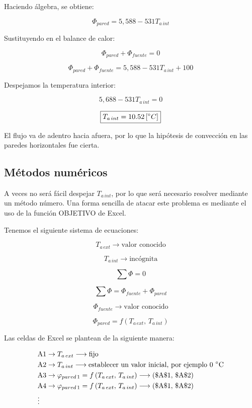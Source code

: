 \documentclass[12pt]{article}
\begin{document}
Haciendo álgebra, se obtiene:

\[ \Phi _{ pared } = 5,588 - 531 T_{ a \, int } \]

Sustituyendo en el balance de calor:

\[ \Phi _{ pared } + \Phi _{ fuente } = 0 \]

\[ \Phi _{ pared } + \Phi _{ fuente } = 5,588 -531 T_{ a \, int } + 100 \]

Despejamos la temperatura interior: 

\[ 5,688 - 531 T_{ a \, int } = 0 \]

\[ \boxed{
    T_{ a \, int } = 10.52 \left[ \degree C \right]
} \]

El flujo va de adentro hacia afuera, por lo que la hipótesis de convección en las paredes horizontales fue cierta.

\subsection*{Métodos numéricos}

A veces no será fácil despejar $ T_{ a \, int} $, por lo que será necesario resolver mediante un método número. Una forma sencilla de atacar este problema es mediante el uso de la función OBJETIVO de Excel.

Tenemos el siguiente sistema de ecuaciones:

\[ T_{ a \, ext } \longrightarrow \text{valor conocido} \]

\[ T_{ a \, int } \longrightarrow \text{incógnita} \]

\[ \sum{ \Phi } = 0 \]

\[ \sum{ \Phi } = \Phi _{ fuente } + \Phi _{ pared } \]

\[ \Phi _{ fuente } \longrightarrow \text{valor conocido} \]

\[ \Phi _{ pared } = f \left( T_{ a \, ext }, \, T_{ a \, int } \right) \]

Las celdas de Excel se plantean de la siguiente manera:


\[ \begin{aligned}
    & \mathrm{A} 1 \rightarrow T_{ a \, ext } \longrightarrow \text{fijo} \\
    & \mathrm{A} 2 \rightarrow T_{ a \, int } \longrightarrow \text{establecer un valor inicial, por ejemplo 0 \degree C} \\
    & \mathrm{A} 3 \rightarrow \varphi _{ pared \, 1 } = f \left( T_{ a \, ext }, \, T_{ a \, int } \right) \longrightarrow  \left( \$ \mathrm{A} \$ 1, \, \$ \mathrm{A} \$ 2 \right) \\
    & \mathrm{A} 4 \rightarrow \varphi _{ pared \, 1 } = f \left( T_{ a \, ext }, \, T_{ a \, int } \right) \longrightarrow  \left( \$ \mathrm{A} \$ 1, \, \$ \mathrm{A} \$ 2 \right) \\
    & \vdots
\end{aligned} \]

\[ \]

\[ \]

\end{document}
